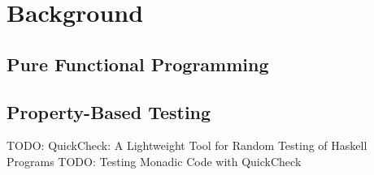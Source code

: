 \section{Background}

\subsection{Pure Functional Programming}

\subsection{Property-Based Testing}
TODO: QuickCheck: A Lightweight Tool for Random Testing of Haskell Programs \cite{claessen_quickcheck:_2000}
TODO: Testing Monadic Code with QuickCheck \cite{claessen_testing_2002}
